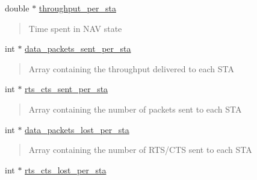 \begin{DoxyCompactItemize}
double $\ast$ \hyperlink{structPerformance_acc204ea568287cc6c0dfd9193f9f512c}{throughput\+\_\+per\+\_\+sta}
\begin{DoxyCompactList}\small\item\em \begin{quote}
Time spent in N\+AV state \end{quote}
\end{DoxyCompactList}\item 
\mbox{\label{structPerformance_a6ed7cb5a6aa0c4e1e40fc3db635b4a80}} 
int $\ast$ \hyperlink{structPerformance_a6ed7cb5a6aa0c4e1e40fc3db635b4a80}{data\+\_\+packets\+\_\+sent\+\_\+per\+\_\+sta}
\begin{DoxyCompactList}\small\item\em \begin{quote}
Array containing the throughput delivered to each S\+TA \end{quote}
\end{DoxyCompactList}\item 
\mbox{\label{structPerformance_ab19cf7e4509329136c677b17d2df399b}} 
int $\ast$ \hyperlink{structPerformance_ab19cf7e4509329136c677b17d2df399b}{rts\+\_\+cts\+\_\+sent\+\_\+per\+\_\+sta}
\begin{DoxyCompactList}\small\item\em \begin{quote}
Array containing the number of packets sent to each S\+TA \end{quote}
\end{DoxyCompactList}\item 
\mbox{\label{structPerformance_a5cc1026974998d12e0a2ce829a7979ee}} 
int $\ast$ \hyperlink{structPerformance_a5cc1026974998d12e0a2ce829a7979ee}{data\+\_\+packets\+\_\+lost\+\_\+per\+\_\+sta}
\begin{DoxyCompactList}\small\item\em \begin{quote}
Array containing the number of R\+T\+S/\+C\+TS sent to each S\+TA \end{quote}
\end{DoxyCompactList}\item 
\mbox{\label{structPerformance_a841ce73c4b7e543acaf7252c552e15a4}} 
int $\ast$ \hyperlink{structPerformance_a841ce73c4b7e543acaf7252c552e15a4}{rts\+\_\+cts\+\_\+lost\+\_\+per\+\_\+sta}

\end{DoxyCompactItemize}
